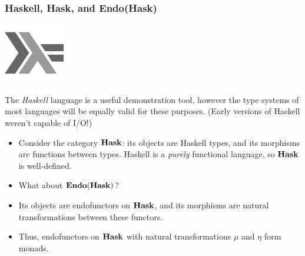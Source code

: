 \documentclass{beamer}
\numberwithin{figure}{section}
\begin{document}
\begin{frame}
        \frametitle{Haskell, \textbf{Hask}, and \textbf{Endo}(\textbf{Hask})}
        \begin{center}
                \begin{minipage}{.2\textwidth}
                        \includegraphics{hasklogo.pdf}
                \end{minipage}
                \begin{minipage}{.7\textwidth}
                        The \textit{Haskell} language is a useful demonstration
                        tool, however the type systems of most languages will be
                        equally valid for these purposes. (Early versions of
                        Haskell weren't capable of I/O!)
                \end{minipage}
        \end{center}
        \pause
        \begin{itemize}
                \item Consider the category $\operatorname{\mathbf{Hask}}$: its objects are Haskell
                        types, and its morphisms are functions between types.
                        Haskell is a \textit{purely} functional language, so
                        $\operatorname{\mathbf{Hask}}$ is well-defined.
                \item What about $\operatorname{\mathbf{Endo}}(\operatorname{\mathbf{Hask}})$?
                \item Its objects are endofunctors on $\operatorname{\mathbf{Hask}}$, and its
                        morphisms are natural transformations between these
                        functors.
                \item Thus, endofunctors on $\operatorname{\mathbf{Hask}}$ with natural
                        transformations $\mu$ and $\eta$ form monads.
        \end{itemize}
\end{frame}
\end{document}
